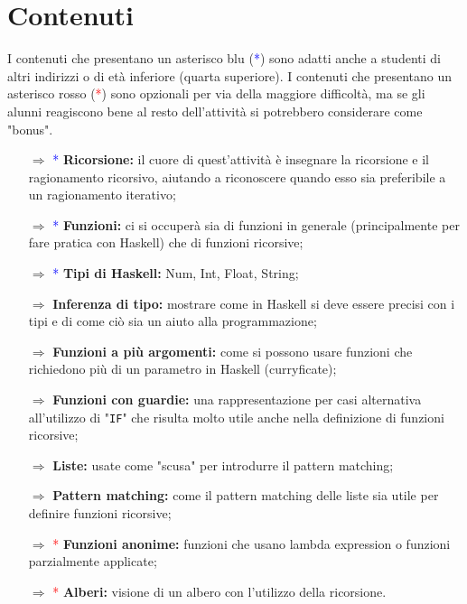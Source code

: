 \section{Contenuti}

I contenuti che presentano un asterisco blu (\textcolor{blue}{*}) sono
adatti anche a studenti di altri indirizzi o di età inferiore (quarta superiore). I contenuti che presentano un asterisco rosso (\textcolor{red}{*}) sono
opzionali per via della maggiore difficoltà, ma se gli alunni reagiscono bene al resto dell'attività
si potrebbero considerare come "bonus".

\begin{itemize}
    \item [$\Rightarrow$] \textcolor{blue}{*} \textbf{Ricorsione:} il cuore di quest'attività è insegnare la ricorsione e il
    ragionamento ricorsivo, aiutando a riconoscere quando esso sia preferibile a un ragionamento iterativo;
    \item [$\Rightarrow$] \textcolor{blue}{*} \textbf{Funzioni:} ci si occuperà sia di funzioni in generale (principalmente per fare pratica con Haskell)
    che di funzioni ricorsive;
    \item [$\Rightarrow$] \textcolor{blue}{*} \textbf{Tipi di Haskell:} Num, Int, Float, String;
    \item [$\Rightarrow$] \textbf{Inferenza di tipo:} mostrare come in Haskell si deve essere precisi con i tipi e di come ciò sia un aiuto alla programmazione;
    \item [$\Rightarrow$] \textbf{Funzioni a più argomenti:} come si possono usare funzioni che richiedono più di un parametro in Haskell (curryficate);
    \item [$\Rightarrow$] \textbf{Funzioni con guardie:} una rappresentazione per casi alternativa all'utilizzo di "\texttt{IF}" che risulta molto utile
    anche nella definizione di funzioni ricorsive;
    \item [$\Rightarrow$] \textbf{Liste:} usate come "scusa" per introdurre il pattern matching;
    \item [$\Rightarrow$] \textbf{Pattern matching:} come il pattern matching delle liste sia utile per definire funzioni ricorsive;
    \item [$\Rightarrow$] \textcolor{red}{*} \textbf{Funzioni anonime:} funzioni che usano lambda expression o funzioni parzialmente applicate;
    \item [$\Rightarrow$] \textcolor{red}{*} \textbf{Alberi:} visione di un albero con l'utilizzo della ricorsione.
\end{itemize}

